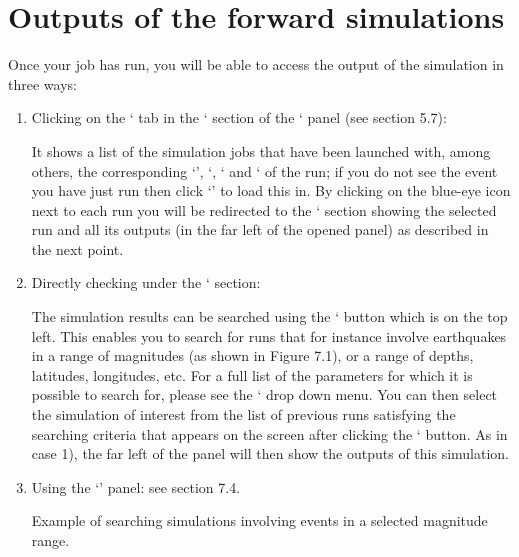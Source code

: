 \documentclass[english]{book}
\begin{document}
\section{Outputs of the forward simulations}
\label{\detokenize{Section7:outputs-of-the-forward-simulations}}
Once your job has run, you will be able to access the output of the
simulation in three ways:
\begin{enumerate}
\item {} 
Clicking on the ‘ tab in the ‘ section of
the ‘  panel (see section 5.7):

It shows a list of the simulation jobs that have been launched with,
among others, the corresponding ‘’, ‘,
‘ and ‘ of the run; if you do not see the event you
have just run then click ‘’ to load this in. By
clicking on the blue-eye icon next to each run you will be redirected to
the ‘ section showing the selected run and all its outputs
(in the far left of the opened panel) as described in the next point.

\item {} 
Directly checking under the ‘ section:

The simulation results can be searched using the ‘ button
which is on the top left. This enables you to search for runs that for
instance involve earthquakes in a range of magnitudes (as shown in
Figure 7.1), or a range of depths, latitudes, longitudes, etc. For a
full list of the parameters for which it is possible to search for,
please see the ‘ drop down menu. You can then select the
simulation of interest from the list of previous runs satisfying the
searching criteria that appears on the screen after clicking the
‘ button. As in case 1), the far left of the panel will then
show the outputs of this simulation.

\item {} 
Using the ‘’ panel: see section 7.4.


 Example of searching simulations involving events in a
selected magnitude range.

\end{enumerate}
\end{document}

